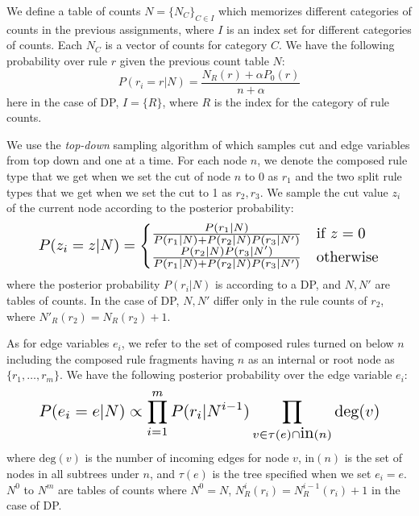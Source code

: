 We define a 
table of counts $N=\{N_C\}_{C\in I}$ which memorizes different categories of counts in 
the previous assignments, where $I$
is an index set for different categories of counts. Each $N_C$ is a vector of counts for category $C$. 
We have the following probability over rule $r$ given the previous count table $N$:
\begin{equation}
P(r_i = r| N) = \frac{N_R(r) + \alpha P_0 (r)}{n + \alpha }
\end{equation}
here in the case of DP, $I=\{R\}$, where $R$ is the index for the category of rule counts.


We use the {\em top-down} sampling algorithm of  which samples cut and edge variables from top down and one at a time.
For each node $n$, we denote the composed rule type
that we get when we set the cut of node $n$ to 0 as $r_1$ and the two 
split rule types that we get when we set the cut to 1 as $r_2, r_3$. We sample the cut value $z_i$ of the 
current node according to the posterior probability:
\begin{equation}
\label{eq:cut}
\resizebox{.88\hsize}{!}{$\displaystyle
P(z_i = z| N) = 
\begin{cases} 
\frac{ P (r_1| N) }{P (r_1|N) + P (r_2| N) P (r_3| N') } &\mbox{if } z = 0 \\ 
\frac{ P (r_2| N) P (r_3| N') }{P (r_1| N)+ P (r_2| N) P (r_3| N') } &\mbox{otherwise}
\end{cases}$}
\end{equation}
where the posterior probability $P(r_i|N)$ is according to a DP, 
and $N, N'$ are tables of 
counts. In the case of DP, $N, N'$ differ only in the rule counts of $r_2$, where $N'_R(r_2)= 
N_R(r_2)+1$.


As for edge variables $e_i$, we refer to the set of composed rules turned on below $n$ including the 
composed rule fragments having $n$ as an internal or root node as $\{r_1,\ldots,r_m\}$. We have the 
following posterior probability over the edge variable $e_i$:
\begin{equation}
\resizebox{.88\hsize}{!}{$\displaystyle
P(e_i = e| N) \propto \prod_{i=1}^m P(r_i| N^{i-1}) \prod_{v \in \tau(e)\cap \mbox{in}(n)} \mbox{deg}(v)
$}
\end{equation}
where $\mbox{deg}(v)$ is the number of incoming edges for node $v$, 
$\mbox{in}(n)$ is the set of nodes 
in all subtrees under $n$, and $\tau(e)$ is the tree specified when we set $e_i = e$. $N^0$ to $N^m$ 
are tables of counts where $N^0 = N$, $N^i_R(r_i) = N^{i-1}_R(r_i) + 1$ in the case of DP.


